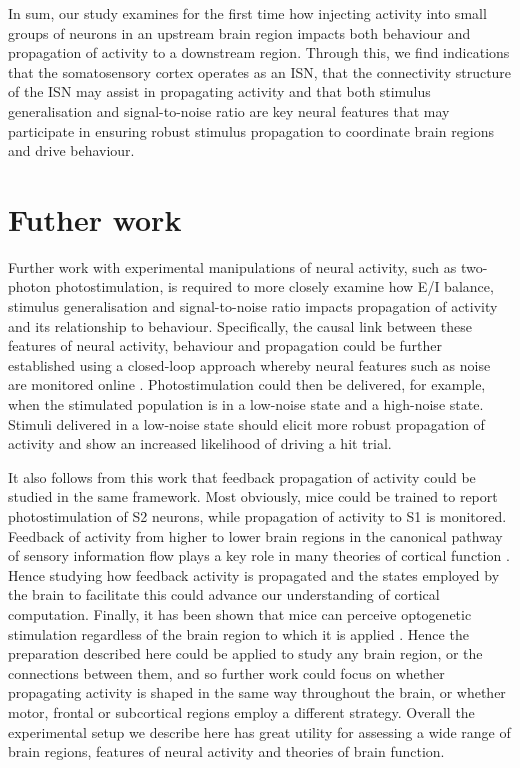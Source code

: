 In sum, our study examines for the first time how injecting activity into small groups of neurons in an upstream brain region impacts both behaviour and propagation of activity to a downstream region. Through this, we find indications that the somatosensory cortex operates as an ISN, that the connectivity structure of the ISN may assist in propagating activity and that both stimulus generalisation and signal-to-noise ratio are key neural features that may participate in ensuring robust stimulus propagation to coordinate brain regions and drive behaviour. 

\section{Futher work}
Further work with experimental manipulations of neural activity, such as two-photon photostimulation, is required to more closely examine how E/I balance, stimulus generalisation and signal-to-noise ratio impacts propagation of activity and its relationship to behaviour. Specifically, the causal link between these features of neural activity, behaviour and propagation could be further established using a closed-loop approach \cite{zhang_closed-loop_2018} whereby neural features such as noise are monitored online \cite{giovannucci_onacid_2017-1}. Photostimulation could then be delivered, for example, when the stimulated population is in a low-noise state and a high-noise state. Stimuli delivered in a low-noise state should elicit more robust propagation of activity and show an increased likelihood of driving a hit trial.  

It also follows from this work that feedback propagation of activity could be studied in the same framework. Most obviously, mice could be trained to report photostimulation of S2 neurons, while propagation of activity to S1 is monitored. Feedback of activity from higher to lower brain regions in the canonical pathway of sensory information flow plays a key role in many theories of cortical function \cite{rao_predictive_1999, lillicrap_backpropagation_2020}. Hence studying how feedback activity is propagated and the states employed by the brain to facilitate this could advance our understanding of cortical computation. Finally, it has been shown that mice can perceive optogenetic stimulation regardless of the brain region to which it is applied \cite{luis-islas_interoceptive_2021}. Hence the preparation described here could be applied to study any brain region, or the connections between them, and so further work could focus on whether propagating activity is shaped in the same way throughout the brain, or whether motor, frontal or subcortical regions employ a different strategy. Overall the experimental setup we describe here has great utility for assessing a wide range of brain regions, features of neural activity and theories of brain function.

